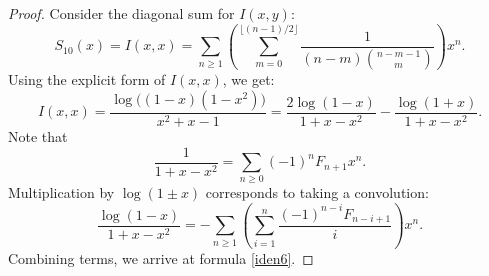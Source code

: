 \documentclass[10pt,a4paper]{amsart}
\begin{document}
\begin{proof}
 Consider the diagonal sum for \( I(x,y) \):
\[
S_{10}(x) = I(x,x) = \sum_{n\geq 1}\left(
\sum_{m=0}^{\lfloor (n-1)/2 \rfloor} \frac{1}{(n-m)\binom{n-m-1}{m}}
\right)x^n.
\]
Using the explicit form of \( I(x,x) \), we get:
\[
I(x,x) = \frac{\log\!\bigl((1-x)(1-x^2)\bigr)}{x^2+x-1}
= \frac{2\log(1-x)}{1+x-x^2} - \frac{\log(1+x)}{1+x-x^2}.
\]
Note that
\[
\frac{1}{1+x-x^2} = \sum_{n\geq 0} (-1)^n F_{n+1} x^n.
\]
Multiplication by \( \log(1\pm x) \) corresponds to taking a convolution:
\[
\frac{\log(1-x)}{1+x-x^2} = -\sum_{n\geq 1}\left(
\sum_{i=1}^n \frac{(-1)^{n-i} F_{n-i+1}}{i}
\right)x^n.
\]
Combining terms, we arrive at formula \eqref{iden6}.
\end{proof}
\end{document}
